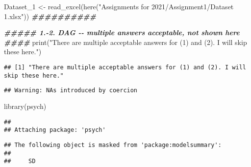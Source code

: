 \documentclass[
]{article}
\newenvironment{Shaded}{\begin{snugshade}}{\end{snugshade}}
\newcommand{\CommentTok}[1]{\textcolor[rgb]{0.56,0.35,0.01}{\textit{#1}}}
\newcommand{\DocumentationTok}[1]{\textcolor[rgb]{0.56,0.35,0.01}{\textbf{\textit{#1}}}}
\newcommand{\FunctionTok}[1]{\textcolor[rgb]{0.00,0.00,0.00}{#1}}
\newcommand{\NormalTok}[1]{#1}
\newcommand{\OtherTok}[1]{\textcolor[rgb]{0.56,0.35,0.01}{#1}}
\newcommand{\SpecialCharTok}[1]{\textcolor[rgb]{0.00,0.00,0.00}{#1}}
\newcommand{\StringTok}[1]{\textcolor[rgb]{0.31,0.60,0.02}{#1}}
\begin{document}
\begin{Shaded}
\begin{Highlighting}[]
\NormalTok{Dataset\_1 }\OtherTok{\textless{}{-}} \FunctionTok{read\_excel}\NormalTok{(}\FunctionTok{here}\NormalTok{(}\StringTok{"Assignments for 2021/Assignment1/Dataset 1.xlsx"}\NormalTok{))}
\DocumentationTok{\#\#\#\#\#\#\#\#\#\#}


\DocumentationTok{\#\#\#\#\# 1.{-}2. DAG {-}{-} multiple answers acceptable, not shown here \#\#\#\#}
\FunctionTok{print}\NormalTok{(}\StringTok{"There are multiple acceptable answers for (1) and (2). I will skip these here."}\NormalTok{)}
\end{Highlighting}
\end{Shaded}

\begin{verbatim}
## [1] "There are multiple acceptable answers for (1) and (2). I will skip these here."
\end{verbatim}

\begin{Shaded}
\end{Shaded}

\begin{verbatim}
## Warning: NAs introduced by coercion
\end{verbatim}

\begin{Shaded}
\begin{Highlighting}[]
\FunctionTok{library}\NormalTok{(psych)}
\end{Highlighting}
\end{Shaded}

\begin{verbatim}
## 
## Attaching package: 'psych'
\end{verbatim}

\begin{verbatim}
## The following object is masked from 'package:modelsummary':
## 
##     SD
\end{verbatim}
\end{document}
